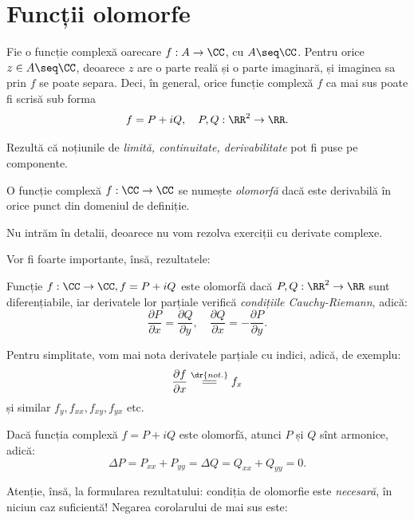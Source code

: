 \section{Funcții olomorfe}

Fie o funcție complexă oarecare $ f : A \to \CC $, cu $ A \seq \CC $.
Pentru orice $ z \in A \seq \CC $, deoarece $ z $ are o parte reală și
o parte imaginară, și imaginea sa prin $ f $ se poate separa. Deci, în general,
orice funcție complexă $ f $ ca mai sus poate fi scrisă sub forma
\[
  f = P + iQ, \quad P, Q : \RR^2 \to \RR.
\]

Rezultă că noțiunile de \emph{limită, continuitate, derivabilitate} pot fi puse
pe componente.

\begin{definition}\label{def:olo}
  O funcție complexă $ f : \CC \to \CC $ se numește \emph{olomorfă} dacă este
  derivabilă în orice punct din domeniul de definiție.
\end{definition}

Nu intrăm în detalii, deoarece nu vom rezolva exerciții cu derivate complexe.

Vor fi foarte importante, însă, rezultatele:

\begin{theorem}\label{thm:cauchy-riemann}
  Funcție $ f : \CC \to \CC, f = P + iQ $ este olomorfă dacă $ P, Q : \RR^2 \to \RR $
  sunt diferențiabile, iar derivatele lor parțiale verifică \emph{condițiile %
    Cauchy-Riemann}, adică:
  \[
    \dfrac{\partial P}{\partial x} = \dfrac{\partial Q}{\partial y}, \quad %
    \dfrac{\partial Q}{\partial x} = -\dfrac{\partial P}{\partial y}.
  \]
\end{theorem}

\begin{remark}\label{rk:der-part}
  Pentru simplitate, vom mai nota derivatele parțiale cu indici, adică, de exemplu:
  \[
    \dfrac{\partial f}{\partial x} \stackrel{\dr{not.}}{=\joinrel=} f_x
  \]
  și similar $ f_y, f_{xx}, f_{xy}, f_{yx} $ etc.
\end{remark}

\begin{corollary}\label{cor:olo-arm}
  Dacă funcția complexă $ f = P + iQ $ este olomorfă, atunci $ P $ și $ Q $ sînt
  armonice, adică:
  \[
    \Delta P = P_{xx} + P_{yy} = \Delta Q = Q_{xx} + Q_{yy} = 0.
  \]
\end{corollary}

Atenție, însă, la formularea rezultatului: condiția de olomorfie este \emph{necesară},
în niciun caz suficientă! Negarea corolarului de mai sus este:


